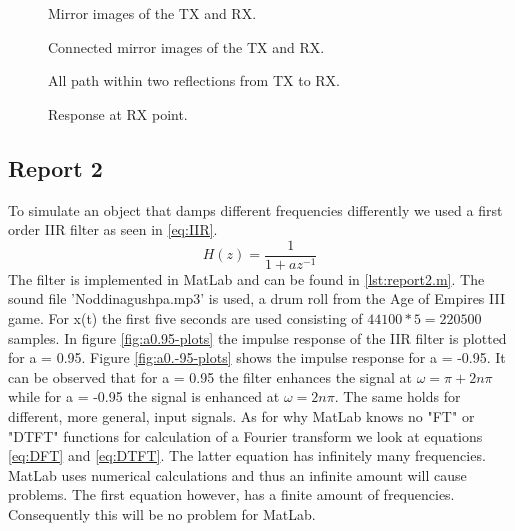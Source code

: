 \documentclass[final]{scrreprt} %
\begin{document}
\begin{figure}[H]
	\centering
	\setlength\figureheight{6cm}
    	\setlength\figurewidth{6cm}
	
	\caption{Mirror images of the TX and RX.}
	\label{fig:mirror}
\end{figure}

\begin{figure}[H]
	\centering
	\setlength\figureheight{6cm}
    	\setlength\figurewidth{6cm}
	
	\caption{Connected mirror images of the TX and RX.}
	\label{fig:connected}
\end{figure}

\begin{figure}[H]
	\centering
	\setlength\figureheight{6cm}
    	\setlength\figurewidth{6cm}
	
	\caption{All path within two reflections from TX to RX.}
	\label{fig:reflections}
\end{figure}

\begin{figure}[H]
	\centering
	\setlength\figureheight{4cm}
    	\setlength{}
	
	\caption{Response at RX point.}
	\label{fig:response}
\end{figure}

\subsection{Report 2}
To simulate an object that damps different frequencies differently we used a first order IIR filter as seen in \ref{eq:IIR}.
\begin{equation}
H(z) = \dfrac{1}{1+az^{-1}}
\label{eq:IIR}
\end{equation}
The filter is implemented in MatLab and can be found in \ref{lst:report2.m}. 
The sound file 'Noddinagushpa.mp3' is used, a drum roll from the Age of Empires III game. 
For x(t) the first five seconds are used consisting of $44100*5 = 220500$ samples. 
In figure \ref{fig:a0.95-plots} the impulse response of the IIR filter is plotted for a = 0.95. 
Figure \ref{fig:a0.-95-plots} shows the impulse response for a = -0.95.
It can be observed that for a = 0.95 the filter enhances the signal at $\omega = \pi + 2n\pi$ while for a = -0.95 the signal is enhanced at $\omega = 2n\pi$. 
The same holds for different, more general, input signals.
\newpage
As for why MatLab knows no "FT" or "DTFT" functions for calculation of a Fourier transform we look at equations \ref{eq:DFT} and \ref{eq:DTFT}. The latter equation has infinitely many frequencies. 
MatLab uses numerical calculations and thus an infinite amount will cause problems.
The first equation however, has a finite amount of frequencies.
Consequently this will be no problem for MatLab.
\end{document}
